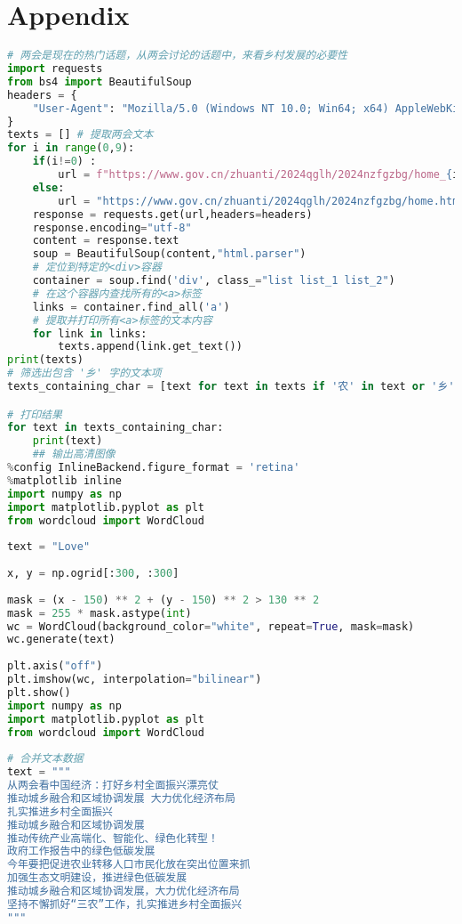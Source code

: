\newpage
\section{Appendix}
\begin{lstlisting}[language=python,caption={两会数据爬虫}]
# 两会是现在的热门话题，从两会讨论的话题中，来看乡村发展的必要性
import requests
from bs4 import BeautifulSoup
headers = {
    "User-Agent": "Mozilla/5.0 (Windows NT 10.0; Win64; x64) AppleWebKit/537.36 (KHTML, like Gecko) Chrome/121.0.0.0 Safari/537.36 Edg/121.0.0.0"
}
texts = [] # 提取两会文本
for i in range(0,9):
    if(i!=0) :
        url = f"https://www.gov.cn/zhuanti/2024qglh/2024nzfgzbg/home_{i}.htm"
    else:
        url = "https://www.gov.cn/zhuanti/2024qglh/2024nzfgzbg/home.htm"
    response = requests.get(url,headers=headers)
    response.encoding="utf-8"
    content = response.text
    soup = BeautifulSoup(content,"html.parser")
    # 定位到特定的<div>容器
    container = soup.find('div', class_="list list_1 list_2")
    # 在这个容器内查找所有的<a>标签
    links = container.find_all('a')
    # 提取并打印所有<a>标签的文本内容
    for link in links:
        texts.append(link.get_text())
print(texts)
# 筛选出包含 '乡' 字的文本项
texts_containing_char = [text for text in texts if '农' in text or '乡' in text  or '村' in text or '城' in text or '绿' in text]

# 打印结果
for text in texts_containing_char:
    print(text)
    ## 输出高清图像
%config InlineBackend.figure_format = 'retina'
%matplotlib inline
import numpy as np
import matplotlib.pyplot as plt
from wordcloud import WordCloud
 
text = "Love"
 
x, y = np.ogrid[:300, :300]
 
mask = (x - 150) ** 2 + (y - 150) ** 2 > 130 ** 2
mask = 255 * mask.astype(int)
wc = WordCloud(background_color="white", repeat=True, mask=mask)
wc.generate(text)
 
plt.axis("off")
plt.imshow(wc, interpolation="bilinear")
plt.show()
import numpy as np
import matplotlib.pyplot as plt
from wordcloud import WordCloud
 
# 合并文本数据
text = """
从两会看中国经济：打好乡村全面振兴漂亮仗
推动城乡融合和区域协调发展 大力优化经济布局
扎实推进乡村全面振兴
推动城乡融合和区域协调发展
推动传统产业高端化、智能化、绿色化转型！
政府工作报告中的绿色低碳发展
今年要把促进农业转移人口市民化放在突出位置来抓
加强生态文明建设，推进绿色低碳发展
推动城乡融合和区域协调发展，大力优化经济布局
坚持不懈抓好“三农”工作，扎实推进乡村全面振兴
"""
 

\end{lstlisting}

